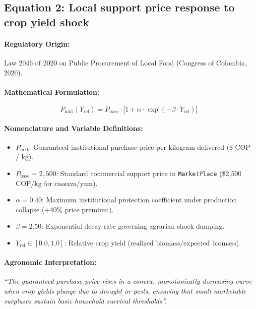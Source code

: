 \documentclass[11pt,a4paper]{article}
\begin{document}
\subsection{Equation 2: Local support price response to crop yield shock}

\paragraph{Regulatory Origin:} Law 2046 of 2020 on Public Procurement of Local Food (Congress of Colombia, 2020).

\paragraph{Mathematical Formulation:}
\begin{equation}
    P_{\text{mkt}}(Y_{\text{rel}}) = P_{\text{base}} \cdot \Big[1 + \alpha \cdot \exp\left(-\beta \cdot Y_{\text{rel}}\right)\Big]
\end{equation}

\paragraph{Nomenclature and Variable Definitions:}
\begin{itemize}[leftmargin=*]
    \item $P_{\text{mkt}}$: Guaranteed institutional purchase price per kilogram delivered (\$ COP / kg).
    \item $P_{\text{base}} = 2,500$: Standard commercial support price in \texttt{MarketPlace} (\$2,500 COP/kg for cassava/yam).
    \item $\alpha = 0.40$: Maximum institutional protection coefficient under production collapse (+40\% price premium).
    \item $\beta = 2.50$: Exponential decay rate governing agrarian shock damping.
    \item $Y_{\text{rel}} \in [0.0, 1.0]$: Relative crop yield ($\text{realized biomass} / \text{expected biomass}$).
\end{itemize}

\paragraph{Agronomic Interpretation:} \textit{``The guaranteed purchase price rises in a convex, monotonically decreasing curve when crop yields plunge due to drought or pests, ensuring that small marketable surpluses sustain basic household survival thresholds''.}
\end{document}
